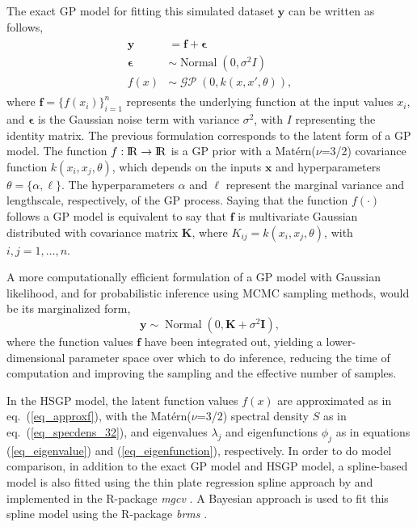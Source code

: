 \documentclass[onecolumn,a4paper,11pt]{article}
\DeclareMathOperator{\GP}{\mathcal{GP}}
\DeclareMathOperator{\Normal}{Normal}
\begin{document}
The exact GP model for fitting this simulated dataset $\bm{y}$ can be written as follows,
%
\begin{align*}\label{ch5_eq_latentgp_simudata1}
\begin{split}
\bm{y} &= \bm{f} + \bm{\epsilon} \\
\bm{\epsilon} &\sim \Normal(0, \sigma^2  I) \\
f(x) &\sim \GP(0, k(x, x', \theta)),
\end{split}
\end{align*}
%
where $\bm{f}=\{f(x_i)\}_{i=1}^n$ represents the underlying function at the input values $x_i$, and $\bm{\epsilon}$ is the Gaussian noise term with variance $\sigma^2$, with $I$ representing the identity matrix. The previous formulation corresponds to the latent form of a GP model. The function $f:{\rm I\!R} \to {\rm I\!R}$ is a GP prior with a Mat{\'e}rn($\nu$=3/2) covariance function $k(x_i,x_j,\theta)$, which depends on the inputs $\bm{x}$ and hyperparameters $\theta=\{\alpha,\ell\}$. The hyperparameters $\alpha$ and $\ell$ represent the marginal variance and lengthscale, respectively, of the GP process. Saying that the function $f(\cdot)$ follows a GP model is equivalent to say that $\bm{f}$ is multivariate Gaussian distributed with covariance matrix $\bm{K}$, where $K_{ij}=k(x_i,x_j,\theta)$, with $i,j=1,\dots,n$.
 
A more computationally efficient formulation of a GP model with Gaussian likelihood, and for probabilistic inference using MCMC sampling methods, would be its marginalized form,
%
\begin{equation*}\label{ch5_eq_marginalizedgp_simudata1}
\bm{y} \sim \Normal(0,\bm{K}+ \sigma^2 \bm{I} ),
\end{equation*}
%
where the function values $\bm{f}$ have been integrated out, yielding a lower-dimensional parameter space over which to do inference, reducing the time of computation and improving the sampling and the effective number of samples.

In the HSGP model, the latent function values $f(x)$ are approximated as in eq.~(\ref{eq_approxf}), with the Mat{\'e}rn($\nu$=3/2) spectral density $S$ as in eq.~(\ref{eq_specdens_32}), and eigenvalues $\lambda_j$ and eigenfunctions $\phi_j$ as in equations (\ref{eq_eigenvalue}) and (\ref{eq_eigenfunction}), respectively.  In order to do model comparison, in addition to the exact GP model and HSGP model, a spline-based model is also fitted using the thin plate regression spline approach by \citet{wood2003thin} and implemented in the R-package \textit{mgcv} \citep{wood2011mgcv}. A Bayesian approach is used to fit this spline model using the R-package \textit{brms} \citep{burkner2017brms}.
\end{document}
